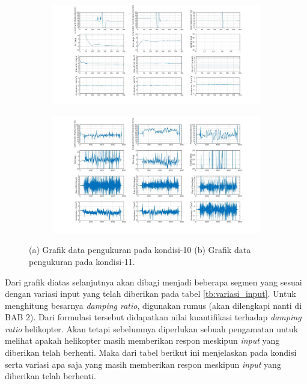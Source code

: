 \begin{figure}[H]
	\begin{subfigure}{0.49\textwidth}
		\centering
		\includegraphics[width=\linewidth]{gambar/Condition_10.jpg}
		\caption{}
		\label{fig:condition_10}
	\end{subfigure}
	\centering
	\begin{subfigure}{0.49\textwidth}
		\centering
		\includegraphics[width=\linewidth]{gambar/Condition_11.jpg}
		\caption{}
		\label{fig:condition_11}
	\end{subfigure}
	\caption{(a) Grafik data pengukuran pada kondisi-10 (b) Grafik data pengukuran pada kondisi-11.}
\end{figure}

Dari grafik diatas selanjutnya akan dibagi menjadi beberapa segmen yang sesuai dengan variasi input yang telah diberikan pada tabel \ref{tb:variasi_input}. Untuk menghitung besarnya \textit{damping ratio}, digunakan rumus (akan dilengkapi nanti di BAB 2). Dari formulasi tersebut didapatkan nilai kuantifikasi terhadap \textit{damping ratio} helikopter. Akan tetapi sebelumnya diperlukan sebuah pengamatan untuk melihat apakah helikopter masih memberikan respon meskipun \textit{input} yang diberikan telah berhenti. Maka dari tabel berikut ini menjelaskan pada kondisi serta variasi apa saja yang masih memberikan respon meskipun \textit{input} yang diberikan telah berhenti.

